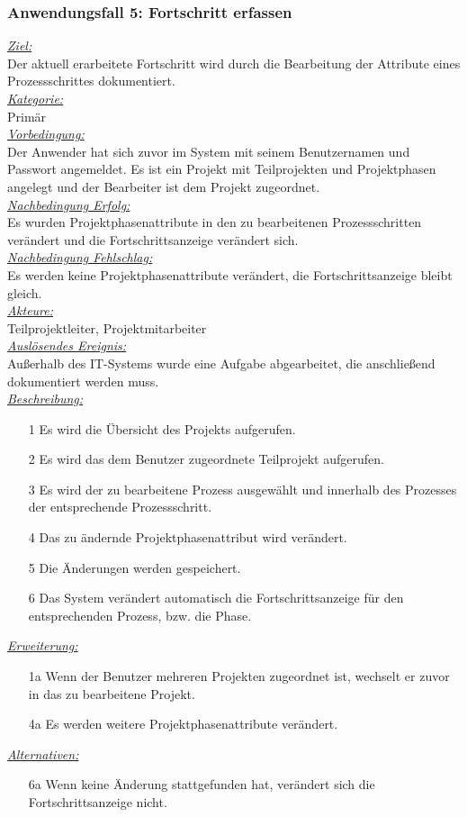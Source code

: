 \newpage
\subsubsection{Anwendungsfall 5: Fortschritt erfassen}
\underline{\emph{Ziel:}}\\
Der aktuell erarbeitete Fortschritt wird durch die Bearbeitung der Attribute eines Prozessschrittes dokumentiert.\\
\underline{\emph{Kategorie:}} \\
Primär\\
\underline{\emph{Vorbedingung:}} \\
Der Anwender hat sich zuvor im System mit seinem Benutzernamen und Passwort angemeldet. Es ist ein Projekt mit Teilprojekten und Projektphasen angelegt und der Bearbeiter ist dem Projekt zugeordnet.\\
\underline{\emph{Nachbedingung Erfolg:}} \\
Es wurden Projektphasenattribute in den zu bearbeitenen Prozessschritten verändert und die Fortschrittsanzeige verändert sich.\\
\underline{\emph{Nachbedingung Fehlschlag:}} \\
Es werden keine Projektphasenattribute verändert, die Fortschrittsanzeige bleibt gleich.\\
\underline{\emph{Akteure:}} \\
Teilprojektleiter, Projektmitarbeiter\\
\underline{\emph{Auslösendes Ereignis:}} \\
Außerhalb des IT-Systems wurde eine Aufgabe abgearbeitet, die anschließend dokumentiert werden muss.\\
\underline{\emph{Beschreibung:}} 
\begin{itemize}
    \item [1] Es wird die Übersicht des Projekts aufgerufen.
    \item [2] Es wird das dem Benutzer zugeordnete Teilprojekt aufgerufen.
    \item [3] Es wird der zu bearbeitene Prozess ausgewählt und innerhalb des Prozesses der entsprechende Prozessschritt.
    \item [4] Das zu ändernde Projektphasenattribut wird verändert.
    \item [5] Die Änderungen werden gespeichert.
    \item [6] Das System verändert automatisch die Fortschrittsanzeige für den entsprechenden Prozess, bzw. die Phase.
\end{itemize}
\underline{\emph{Erweiterung:}} 
\begin{itemize}
    \item [1a] Wenn der Benutzer mehreren Projekten zugeordnet ist, wechselt er zuvor in das zu bearbeitene Projekt. 
    \item [4a] Es werden weitere Projektphasenattribute verändert.
\end{itemize}
\underline{\emph{Alternativen:}}
\begin{itemize}
    \item [6a] Wenn keine Änderung stattgefunden hat, verändert sich die Fortschrittsanzeige nicht.
\end{itemize}



